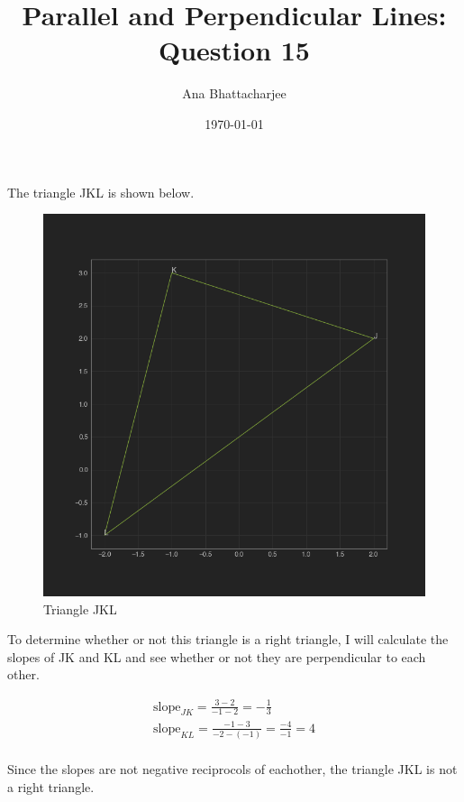 \documentclass{article}
\begin{document}
\author{Ana Bhattacharjee}
\title{Parallel and Perpendicular Lines: Question 15}
\date{\today}

\begin{center}
The triangle JKL is shown below.
\begin{figure}[!htbp]
  \includegraphics[width=1\columnwidth]{../q15}
  \caption{Triangle JKL}
\end{figure}
\par
To determine whether or not this triangle is a right triangle, I will calculate the slopes of JK and KL and see whether or not they are perpendicular to each other.
\par
\begin{align}
  \text{slope}_{JK} = \frac{3-2}{-1 - 2} = -\frac{1}{3} \\
  \text{slope}_{KL} = \frac{-1 - 3}{-2 - (-1)} = \frac{-4}{-1} = 4 \\
\end{align}
\par
Since the slopes are not negative reciprocols of eachother, the triangle JKL is not a right triangle. 
\end{center}
\end{document}
